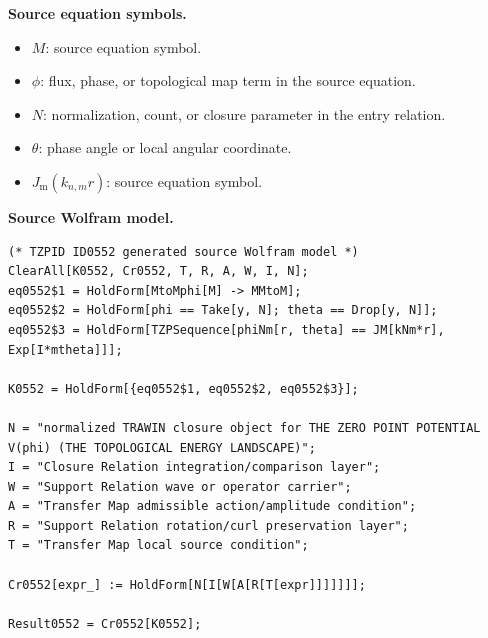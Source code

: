 \begin{minipage}[t]{0.49\linewidth}
\begingroup
\small
\raggedright
\textbf{Source equation symbols.}\par
\begin{itemize}[leftmargin=1.35em,itemsep=1pt,topsep=1pt,parsep=0pt]
    \item $M$: source equation symbol.
    \item $\phi$: flux, phase, or topological map term in the source equation.
    \item $N$: normalization, count, or closure parameter in the entry relation.
    \item $\theta$: phase angle or local angular coordinate.
    \item $J_{\mathrm{m}}(k_{n,m}r)$: source equation symbol.
\end{itemize}
\endgroup
\end{minipage}\hfill
\begin{minipage}[t]{0.47\linewidth}
\begingroup
\scriptsize
\raggedright
\textbf{Source Wolfram model.}\par
\begin{Verbatim}[fontsize=\tiny,breaklines=true,breakanywhere=true]
(* TZPID ID0552 generated source Wolfram model *)
ClearAll[K0552, Cr0552, T, R, A, W, I, N];
eq0552$1 = HoldForm[MtoMphi[M] -> MMtoM];
eq0552$2 = HoldForm[phi == Take[y, N]; theta == Drop[y, N]];
eq0552$3 = HoldForm[TZPSequence[phiNm[r, theta] == JM[kNm*r], Exp[I*mtheta]]];

K0552 = HoldForm[{eq0552$1, eq0552$2, eq0552$3}];

N = "normalized TRAWIN closure object for THE ZERO POINT POTENTIAL V(phi) (THE TOPOLOGICAL ENERGY LANDSCAPE)";
I = "Closure Relation integration/comparison layer";
W = "Support Relation wave or operator carrier";
A = "Transfer Map admissible action/amplitude condition";
R = "Support Relation rotation/curl preservation layer";
T = "Transfer Map local source condition";

Cr0552[expr_] := HoldForm[N[I[W[A[R[T[expr]]]]]]];

Result0552 = Cr0552[K0552];
\end{Verbatim}
\endgroup
\end{minipage}

